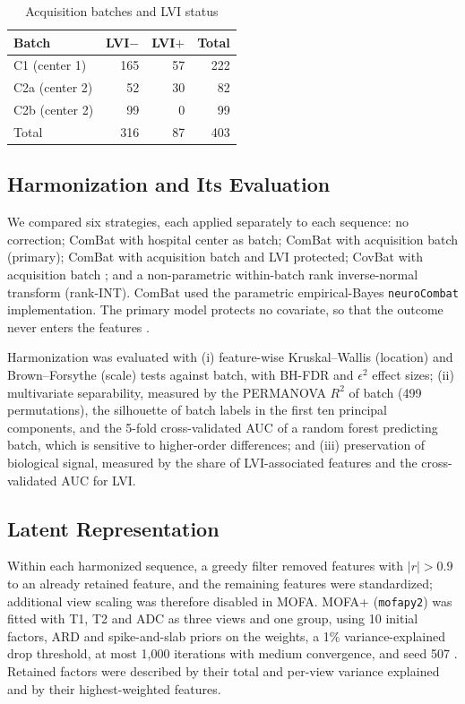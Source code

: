 \documentclass[conference]{IEEEtran}
\begin{document}
\begin{table}[t]
\caption{Acquisition batches and LVI status}
\label{tab:ue-batch}
\centering
\small
\begin{tabular}{lrrr}
\toprule
\textbf{Batch} & \textbf{LVI$-$} & \textbf{LVI$+$} & \textbf{Total} \\
\midrule
C1 (center 1) & 165 & 57 & 222 \\
C2a (center 2) & 52 & 30 & 82 \\
C2b (center 2) & 99 & 0 & 99 \\
\midrule
Total & 316 & 87 & 403 \\
\bottomrule
\end{tabular}
\end{table}

\subsection{Harmonization and Its Evaluation}

We compared six strategies, each applied separately to each sequence: no correction; ComBat with hospital center as batch; ComBat with acquisition batch (primary); ComBat with acquisition batch and LVI protected; CovBat with acquisition batch \cite{chen2022covbat}; and a non-parametric within-batch rank inverse-normal transform (rank-INT). ComBat used the parametric empirical-Bayes \texttt{neuroCombat} implementation. The primary model protects no covariate, so that the outcome never enters the features \cite{nygaard2016methods}.

Harmonization was evaluated with (i) feature-wise Kruskal--Wallis (location) and Brown--Forsythe (scale) tests against batch, with BH-FDR and $\epsilon^2$ effect sizes; (ii) multivariate separability, measured by the PERMANOVA $R^2$ of batch (499 permutations), the silhouette of batch labels in the first ten principal components, and the 5-fold cross-validated AUC of a random forest predicting batch, which is sensitive to higher-order differences; and (iii) preservation of biological signal, measured by the share of LVI-associated features and the cross-validated AUC for LVI.

\subsection{Latent Representation}

Within each harmonized sequence, a greedy filter removed features with $|r|>0.9$ to an already retained feature, and the remaining features were standardized; additional view scaling was therefore disabled in MOFA. MOFA+ (\texttt{mofapy2}) was fitted with T1, T2 and ADC as three views and one group, using 10 initial factors, ARD and spike-and-slab priors on the weights, a 1\% variance-explained drop threshold, at most 1{,}000 iterations with medium convergence, and seed 507 \cite{argelaguet2020mofaplus}. Retained factors were described by their total and per-view variance explained and by their highest-weighted features.
\end{document}
